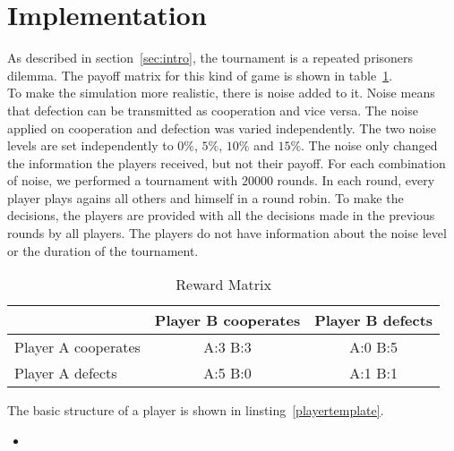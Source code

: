 \section{Implementation}

As described in section~\ref{sec:intro}, the tournament is a repeated prisoners dilemma. The payoff matrix for this kind of game is shown in table~\ref{tab:rewardmatrix}.\\

To make the simulation more realistic, there is noise added to it. Noise means that defection can be transmitted as cooperation and vice versa. The noise applied on cooperation and defection was varied independently. The two noise levels are set independently to $0\%$, $5\%$, $10\%$ and $15\%$. The noise only changed the information the players received, but not their payoff. For each combination of noise, we performed a tournament with $20000$ rounds. In each round, every player plays agains all others and himself in a round robin. To make the decisions, the players are provided with all the decisions made in the previous rounds by all players. The players do not have information about the noise level or the duration of the tournament. \\

\begin{table}[h]

 \begin{center}
\caption{Reward Matrix}\label{tab:rewardmatrix} \vspace{3mm}
\begin{tabular}{|l|c|c|}

\hline
   & Player B cooperates & Player B defects \\
  \hline
  Player A cooperates & A:3 B:3 & A:0 B:5 \\
 \hline
  Player A defects & A:5 B:0 &A:1 B:1 \\
 \hline
\end{tabular}
 \end{center}

\end{table}

The basic structure of a player is shown in linsting~\ref{playertemplate}. 

\begin{itemize}\item[]\end{itemize}

